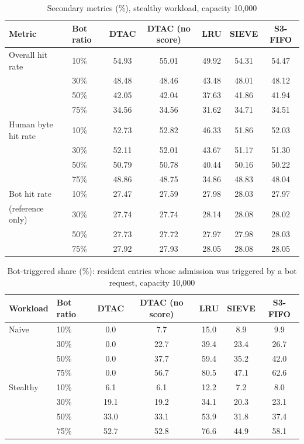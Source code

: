 \begin{table}[htbp]
    \centering
    \caption{Secondary metrics (\%), stealthy workload, capacity 10{,}000}
    \label{tab:app-secondary-stealthy}
    \small
    \begin{tabular}{llccccc}
        \toprule
        Metric & Bot ratio & DTAC & DTAC (no score) & LRU & SIEVE & S3-FIFO \\
        \midrule
        Overall hit rate & 10\% & 54.93 & 55.01 & 49.92 & 54.31 & 54.47 \\
         & 30\% & 48.48 & 48.46 & 43.48 & 48.01 & 48.12 \\
         & 50\% & 42.05 & 42.04 & 37.63 & 41.86 & 41.94 \\
         & 75\% & 34.56 & 34.56 & 31.62 & 34.71 & 34.51 \\
        \midrule
        Human byte hit rate & 10\% & 52.73 & 52.82 & 46.33 & 51.86 & 52.03 \\
         & 30\% & 52.11 & 52.01 & 43.67 & 51.17 & 51.30 \\
         & 50\% & 50.79 & 50.78 & 40.44 & 50.16 & 50.22 \\
         & 75\% & 48.86 & 48.75 & 34.86 & 48.83 & 48.04 \\
        \midrule
        Bot hit rate & 10\% & 27.47 & 27.59 & 27.98 & 28.03 & 27.97 \\
        (reference only) & 30\% & 27.74 & 27.74 & 28.14 & 28.08 & 28.02 \\
         & 50\% & 27.73 & 27.72 & 27.97 & 27.98 & 28.03 \\
         & 75\% & 27.92 & 27.93 & 28.05 & 28.08 & 28.05 \\
        \bottomrule
    \end{tabular}
\end{table}

\begin{table}[htbp]
    \centering
    \caption{Bot-triggered share (\%): resident entries whose admission was triggered by a bot request, capacity 10{,}000}
    \label{tab:app-bot-share}
    \small
    \begin{tabular}{llccccc}
        \toprule
        Workload & Bot ratio & DTAC & DTAC (no score) & LRU & SIEVE & S3-FIFO \\
        \midrule
        Naive & 10\% & 0.0 & 7.7 & 15.0 & 8.9 & 9.9 \\
         & 30\% & 0.0 & 22.7 & 39.4 & 23.4 & 26.7 \\
         & 50\% & 0.0 & 37.7 & 59.4 & 35.2 & 42.0 \\
         & 75\% & 0.0 & 56.7 & 80.5 & 47.1 & 62.6 \\
        \midrule
        Stealthy & 10\% & 6.1 & 6.1 & 12.2 & 7.2 & 8.0 \\
         & 30\% & 19.1 & 19.2 & 34.1 & 20.3 & 23.1 \\
         & 50\% & 33.0 & 33.1 & 53.9 & 31.8 & 37.4 \\
         & 75\% & 52.7 & 52.8 & 76.6 & 44.9 & 58.1 \\
        \bottomrule
    \end{tabular}
\end{table}

